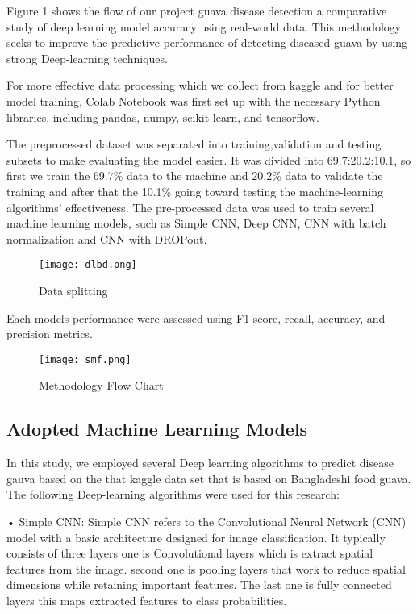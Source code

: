 \documentclass[conference]{IEEEtran}
\begin{document}
Figure 1 shows the flow of our project guava disease detection a comparative study of deep learning model accuracy using real-world data. This methodology seeks to improve the predictive performance of detecting diseased guava by using strong Deep-learning techniques.

For more effective data processing which we collect from kaggle and for better model training, Colab Notebook was first set up with the necessary Python libraries, including pandas, numpy, scikit-learn, and tensorflow.

The preprocessed dataset was separated into training,validation and testing subsets to make evaluating the model easier. It was divided into 69.7:20.2:10.1, so first we train the 69.7\% data to the machine and 20.2\% data to validate the training and after that the 10.1\% going toward testing the machine-learning algorithms' effectiveness. The pre-processed data was used to train several machine learning models, such as Simple CNN, Deep CNN, CNN with batch normalization and CNN with DROPout.

\begin{figure}[h]
  \centering
  \texttt{[image: dlbd.png]}
  \caption{Data splitting}
  \label{fig:your_label}
\end{figure}

Each models performance were assessed using F1-score, recall, accuracy, and precision metrics.

\begin{figure}[h]
  \centering
  \texttt{[image: smf.png]}
  \caption{Methodology Flow Chart}
  \label{fig:your_label}
\end{figure}

\subsection{Adopted Machine Learning Models}

In this study, we employed several Deep learning algorithms to predict disease gauva based on the that kaggle data set that is based on Bangladeshi food guava. The following Deep-learning algorithms were used for this research:

• Simple CNN: Simple CNN refers to the Convolutional Neural Network (CNN) model with a basic architecture designed for image classification. It typically consists of three layers one is Convolutional layers which is extract spatial features from the image. second one is pooling layers that work to reduce spatial dimensions while retaining important features. The last one is fully connected layers this maps extracted features to class probabilities.
\end{document}

